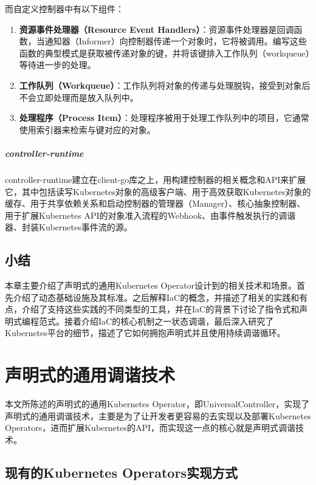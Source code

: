 \documentclass[macfonts,master]{njuthesis}
\begin{document}
而自定义控制器中有以下组件：
\begin{enumerate}
	\item \textbf{资源事件处理器（Resource Event Handlers）}：资源事件处理器是回调函数，当通知器（Informer）向控制器传递一个对象时，它将被调用。编写这些函数的典型模式是获取被传递对象的键，并将该键排入工作队列（workqueue）等待进一步的处理。
	\item \textbf{工作队列（Workqueue）}：工作队列将对象的传递与处理脱钩，接受到对象后不会立即处理而是放入队列中。
	\item \textbf{处理程序（Process Item）}：处理程序被用于处理工作队列中的项目，它通常使用索引器来检索与键对应的对象。
\end{enumerate}

\paragraph{controller-runtime}

controller-runtime建立在client-go库之上，用构建控制器的相关概念和API来扩展它，其中包括\cite{k8s-sigs}读写Kubernetes对象的高级客户端、用于高效获取Kubernetes对象的缓存、用于共享依赖关系和启动控制器的管理器（Manager）、核心抽象控制器、用于扩展Kubernetes API的对象准入流程的Webhook、由事件触发执行的调谐器、封装Kubernetes事件流的源。



\section{小结}
本章主要介绍了声明式的通用Kubernetes Operator设计到的相关技术和场景。首先介绍了动态基础设施及其标准。之后解释IaC的概念，并描述了相关的实践和有点，介绍了支持这些实践的不同类型的工具，并在IaC的背景下讨论了指令式和声明式编程范式。接着介绍IaC的核心机制之一状态调谐，最后深入研究了Kubernetes平台的细节，描述了它如何拥抱声明式并且使用持续调谐循环。

\chapter{声明式的通用调谐技术}\label{chapter_framework}
本文所陈述的声明式的通用Kubernetes Operator，即UniversalController，实现了声明式的通用调谐技术，主要是为了让开发者更容易的去实现以及部署Kubernetes Operators，进而扩展Kubernetes的API，而实现这一点的核心就是声明式调谐技术。

\section{现有的Kubernetes Operators实现方式}
\end{document}
